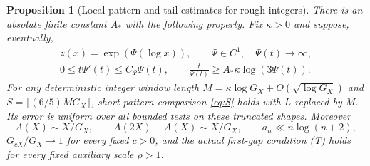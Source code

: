 \documentclass[11pt,a4paper]{article}
\newtheorem{proposition}[theorem]{Proposition}
\begin{document}
\begin{proposition}[Local pattern and tail estimates for rough integers]\label{prop:roughadapter}
There is an absolute finite constant $A_*$ with the following property.
Fix $\kappa>0$ and suppose, eventually,
\begin{equation}\label{eq:roughrange}
 \begin{gathered}
 z(x)=\exp(\Psi(\log x)),\qquad \Psi\in C^1,\quad\Psi(t)\longrightarrow\infty,\\
 0\le t\Psi'(t)\le C_\Psi\Psi(t),\qquad
 \frac{t}{\Psi(t)}\ge A_*\kappa\log(3\Psi(t)).
 \end{gathered}
\end{equation}
For any deterministic integer window length
$M=\kappa\log G_X+O(\sqrt{\log G_X})$ and $S=\lfloor(6/5)MG_X\rfloor$,
short-pattern comparison \eqref{eq:S} holds with $L$ replaced by $M$.
Its error is uniform over all bounded tests on these truncated shapes.
Moreover
\begin{equation}\label{eq:roughdensity}
 A(X)\sim X/G_X,\qquad A(2X)-A(X)\sim X/G_X,
 \qquad a_n\ll n\log(n+2),
\end{equation}
$G_{cX}/G_X\to1$ for every fixed $c>0$, and the actual first-gap
condition (T) holds for every fixed auxiliary scale $\rho>1$.
\end{proposition}
\end{document}
